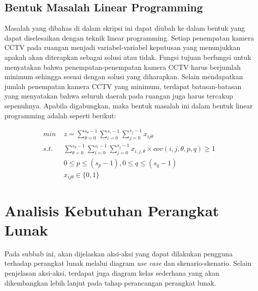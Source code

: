\subsection{Bentuk Masalah Linear Programming}
Masalah yang dibahas di dalam skripsi ini dapat diubah ke dalam bentuk yang dapat diselesaikan dengan teknik linear programming. Setiap penempatan kamera CCTV pada ruangan menjadi variabel-variabel keputusan yang menunjukkan apakah akan diterapkan sebagai solusi atau tidak. Fungsi tujuan berfungsi untuk menyatakan bahwa penempatan-penempatan kamera CCTV harus berjumlah minimum sehingga sesuai dengan solusi yang diharapkan. Selain mendapatkan jumlah penempatan kamera CCTV yang minimum, terdapat batasan-batasan yang menyatakan bahwa seluruh daerah pada ruangan juga harus tercakup sepenuhnya. Apabila digabungkan, maka bentuk masalah ini dalam bentuk linear programming adalah seperti berikut:

\begin{equation*}
	\begin{split}
		\textit{min } & z = \sum_{\theta=0}^{s_{\theta}-1} \sum_{i=0}^{s_i-1} \sum_{j=0}^{s_j-1} x_{ij\theta}\\
		\textit{s.t. } & \sum_{\theta=0}^{s_{\theta}-1} \sum_{i=0}^{s_i-1} \sum_{j=0}^{s_j-1} x_{i,j,\theta} \times cov(i,j,\theta,p,q) \geq 1\\
		& 0 \leq p \leq (s_p - 1), 0 \leq q \leq (s_q - 1)\\
		& x_{ij\theta} \in \{0,1\}
	\end{split}
\end{equation*}

\section{Analisis Kebutuhan Perangkat Lunak}
Pada subbab ini, akan dijelaskan aksi-aksi yang dapat dilakukan pengguna terhadap perangkat lunak melalui diagram \textit{use case} dan skenario-skenario. Selain penjelasan aksi-aksi, terdapat juga diagram kelas sederhana yang akan dikembangkan lebih lanjut pada tahap perancangan perangkat lunak. 

